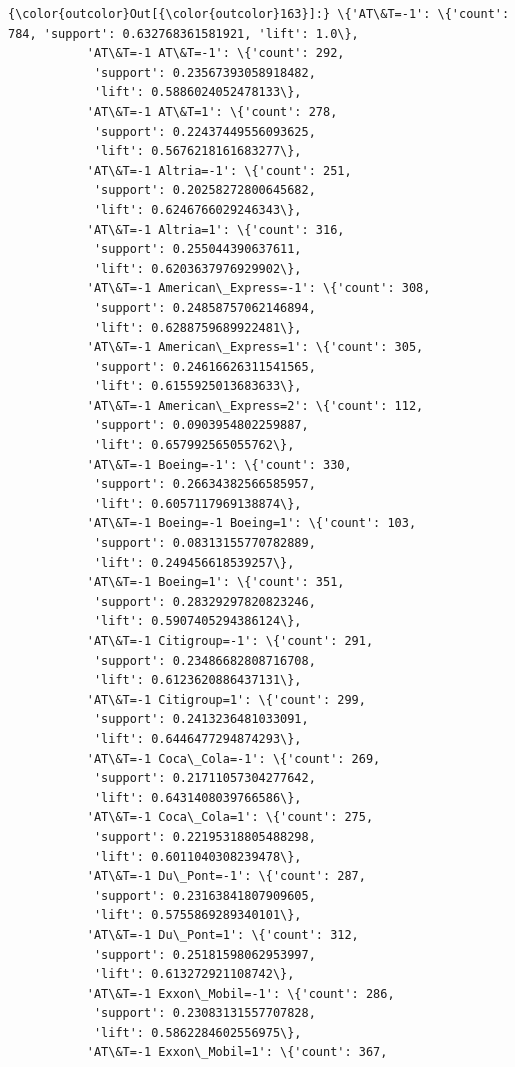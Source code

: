 \documentclass[11pt]{article}
\begin{document}
\begin{Verbatim}[commandchars=\\\{\}]
{\color{outcolor}Out[{\color{outcolor}163}]:} \{'AT\&T=-1': \{'count': 784, 'support': 0.632768361581921, 'lift': 1.0\},
           'AT\&T=-1 AT\&T=-1': \{'count': 292,
            'support': 0.23567393058918482,
            'lift': 0.5886024052478133\},
           'AT\&T=-1 AT\&T=1': \{'count': 278,
            'support': 0.22437449556093625,
            'lift': 0.5676218161683277\},
           'AT\&T=-1 Altria=-1': \{'count': 251,
            'support': 0.20258272800645682,
            'lift': 0.6246766029246343\},
           'AT\&T=-1 Altria=1': \{'count': 316,
            'support': 0.255044390637611,
            'lift': 0.6203637976929902\},
           'AT\&T=-1 American\_Express=-1': \{'count': 308,
            'support': 0.24858757062146894,
            'lift': 0.6288759689922481\},
           'AT\&T=-1 American\_Express=1': \{'count': 305,
            'support': 0.24616626311541565,
            'lift': 0.6155925013683633\},
           'AT\&T=-1 American\_Express=2': \{'count': 112,
            'support': 0.0903954802259887,
            'lift': 0.657992565055762\},
           'AT\&T=-1 Boeing=-1': \{'count': 330,
            'support': 0.26634382566585957,
            'lift': 0.6057117969138874\},
           'AT\&T=-1 Boeing=-1 Boeing=1': \{'count': 103,
            'support': 0.08313155770782889,
            'lift': 0.249456618539257\},
           'AT\&T=-1 Boeing=1': \{'count': 351,
            'support': 0.28329297820823246,
            'lift': 0.5907405294386124\},
           'AT\&T=-1 Citigroup=-1': \{'count': 291,
            'support': 0.23486682808716708,
            'lift': 0.6123620886437131\},
           'AT\&T=-1 Citigroup=1': \{'count': 299,
            'support': 0.2413236481033091,
            'lift': 0.6446477294874293\},
           'AT\&T=-1 Coca\_Cola=-1': \{'count': 269,
            'support': 0.21711057304277642,
            'lift': 0.6431408039766586\},
           'AT\&T=-1 Coca\_Cola=1': \{'count': 275,
            'support': 0.22195318805488298,
            'lift': 0.6011040308239478\},
           'AT\&T=-1 Du\_Pont=-1': \{'count': 287,
            'support': 0.23163841807909605,
            'lift': 0.5755869289340101\},
           'AT\&T=-1 Du\_Pont=1': \{'count': 312,
            'support': 0.25181598062953997,
            'lift': 0.613272921108742\},
           'AT\&T=-1 Exxon\_Mobil=-1': \{'count': 286,
            'support': 0.23083131557707828,
            'lift': 0.5862284602556975\},
           'AT\&T=-1 Exxon\_Mobil=1': \{'count': 367,

\end{Verbatim}
\end{document}
